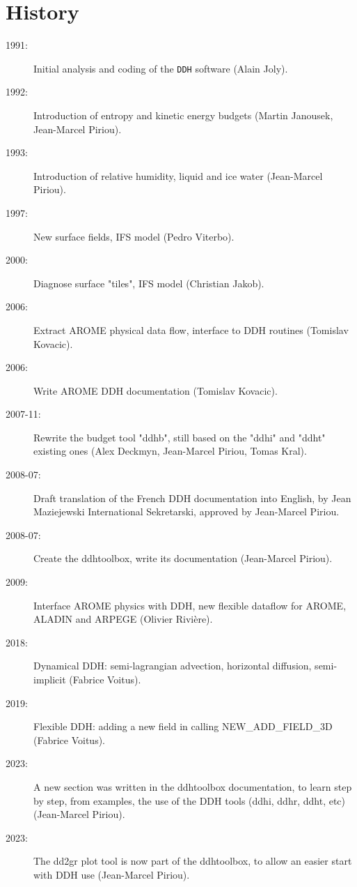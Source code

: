 \chapter{History}

\null
\vspace{1.0cm}
\begin{description}
  \item [1991:] Initial analysis and coding of the {\tt DDH} software (Alain Joly).
  \item [1992:] Introduction of entropy and kinetic energy budgets (Martin Janousek, Jean-Marcel Piriou).
  \item [1993:] Introduction of relative humidity, liquid and ice water (Jean-Marcel Piriou).
  \item [1997:] New surface fields, IFS model (Pedro Viterbo).
  \item [2000:] Diagnose surface "tiles", IFS model (Christian Jakob).
  \item [2006:] Extract AROME physical data flow, interface to DDH routines (Tomislav Kovacic).
  \item [2006:] Write AROME DDH documentation (Tomislav Kovacic).
  \item [2007-11:] Rewrite the budget tool "ddhb",
    still based on the "ddhi" and "ddht" existing ones (Alex Deckmyn, Jean-Marcel Piriou, Tomas Kral).
  \item [2008-07:] Draft translation of the French DDH documentation into English,
    by Jean Maziejewski International Sekretarski, approved by Jean-Marcel Piriou.
  \item [2008-07:] Create the ddhtoolbox, write its documentation (Jean-Marcel Piriou).
  \item [2009:] Interface AROME physics with DDH, new flexible dataflow 
    for AROME, ALADIN and ARPEGE (Olivier Rivière).
  \item [2018:] Dynamical DDH: semi-lagrangian advection, horizontal diffusion, semi-implicit (Fabrice Voitus).
  \item [2019:] Flexible DDH: adding a new field in calling NEW\_ADD\_FIELD\_3D (Fabrice Voitus).
  \item [2023:] A new section was written in the ddhtoolbox documentation, to learn step by step, from examples, the use of the DDH tools (ddhi, ddhr, ddht, etc) (Jean-Marcel Piriou). 
  \item [2023:] The dd2gr plot tool is now part of the ddhtoolbox, to allow an easier start with DDH use (Jean-Marcel Piriou).
\end{description}
